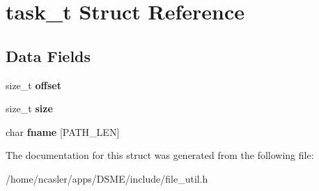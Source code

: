 \hypertarget{structtask__t}{}\section{task\+\_\+t Struct Reference}
\label{structtask__t}
\subsection*{Data Fields}
\begin{DoxyCompactItemize}
\item 
\hypertarget{structtask__t_a4ca575f47056e50da8301683aeeabf9a}{}size\+\_\+t {\bfseries offset}\label{structtask__t_a4ca575f47056e50da8301683aeeabf9a}

\item 
\hypertarget{structtask__t_a2688869cbd5053f91193f75bcbeacc24}{}size\+\_\+t {\bfseries size}\label{structtask__t_a2688869cbd5053f91193f75bcbeacc24}

\item 
\hypertarget{structtask__t_a36787a7e960a588d4a6c4017a0e72a21}{}char {\bfseries fname} \mbox{[}P\+A\+T\+H\+\_\+\+L\+E\+N\mbox{]}\label{structtask__t_a36787a7e960a588d4a6c4017a0e72a21}

\end{DoxyCompactItemize}


The documentation for this struct was generated from the following file\+:\begin{DoxyCompactItemize}
\item 
/home/ncasler/apps/\+D\+S\+M\+E/include/file\+\_\+util.\+h\end{DoxyCompactItemize}
